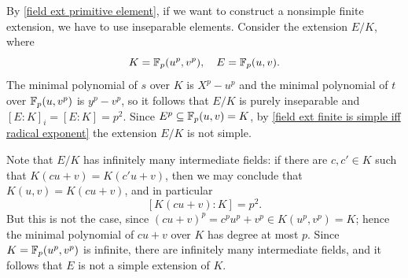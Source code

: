 \begin{example}
By \cref{field ext primitive element}, if we want to construct a nonsimple finite extension, we have to use inseparable elements. Consider the extension $E/K$, where
\[K=\mathbb{F}_p(u^p,v^p),\quad E=\mathbb{F}_p(u,v).\]
The minimal polynomial of $s$ over $K$ is $X^p-u^p$ and the minimal polynomial of $t$ over $\mathbb{F}_p(u,v^p)$ is $y^p-v^p$, so it follows that $E/K$ is purely inseparable and $[E:K]_i=[E:K]=p^2$. Since $E^p\subseteq\mathbb{F}_p(u,v)=K$, by \cref{field ext finite is simple iff radical exponent} the extension $E/K$ is not simple.\par
Note that $E/K$ has infinitely many intermediate fields: if there are $c,c'\in K$ such that $K(cu+v)=K(c'u+v)$, then we may conclude that $K(u,v)=K(cu+v)$, and in particular
\[[K(cu+v):K]=p^2.\]
But this is not the case, since $(cu+v)^p=c^pu^p+v^p\in K(u^p,v^p)=K$; hence the minimal polynomial of $cu+v$ over $K$ has degree at most $p$. Since $K=\mathbb{F}_p(u^p,v^p)$ is infinite, there are infinitely many intermediate fields, and it follows that $E$ is not a simple extension of $K$.
\end{example}
